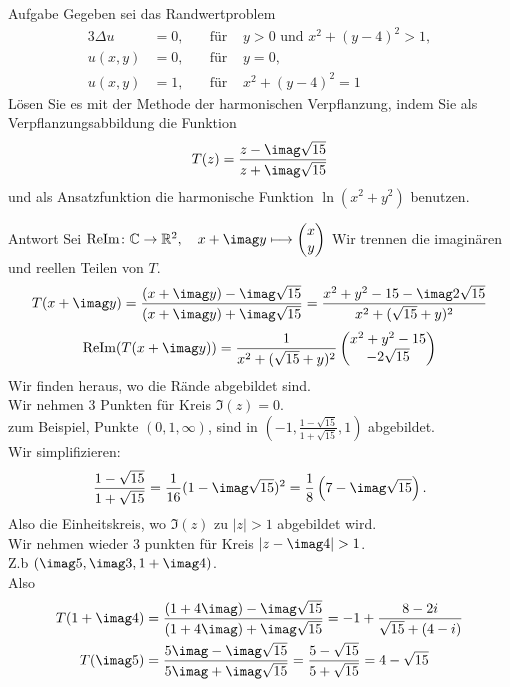 \documentclass{scrartcl}
\def\mbb#1{\mathbb{#1}}
\def\bC{\mbb{C}}
\def\bR{\mbb{R}}
\newcommand{\func}[3]{#1\colon#2\to#3}
\newcommand{\vfunc}[5]{\func{#1}{#2}{#3},\quad#4\longmapsto#5}
\let\-\rightarrow
\begin{document}
\begin{section}{Aufgabe}%
Gegeben sei das Randwertproblem
\begin{alignat*}{3}
 \Delta u&=0,\quad &\text{für }& y>0\text{ und }x^2+(y-4)^2>1,\\
u(x,y)&=0,\quad &\text{für }& y=0,\\
 u(x,y)&=1,\quad &\text{für }& x^2+(y-4)^2=1
\end{alignat*}
Lösen Sie es mit der Methode der harmonischen Verpflanzung, indem Sie als Verpflanzungsabbildung die Funktion
\[T(z)=\frac{z-\imag \sqrt{15}}{z+\imag \sqrt{15}}\]
und als Ansatzfunktion die harmonische Funktion $\ln(x^2+ y^2)$ benutzen.
\begin{subsection}{Antwort}
    Sei $\vfunc{\text{ReIm}}{\bC}{\bR^2}{x+\imag y}{\begin{pmatrix}x\\y\end{pmatrix}}$
    Wir trennen die imaginären und reellen Teilen von $T$.
    \[
    T(x+\imag y)
    =\frac{(x+\imag y)-\imag \sqrt{15}}{(x+\imag y)+\imag \sqrt{15}}
    =\frac{x^2+y^2-15-\imag 2\sqrt{15}}{x^2+(\sqrt{15}+y)^2}
    \]
    \[\text{ReIm}(T(x+\imag y))=\frac{1}{x^2+(\sqrt{15}+y)^2}
    \begin{pmatrix}
        x^2+y^2-15\\-2\sqrt{15}
    \end{pmatrix}
    \]
    Wir finden heraus, wo die Rände abgebildet sind.\\
    Wir nehmen 3 Punkten für Kreis $\Im(z)=0$.\\
    zum Beispiel, Punkte $\left(0,1,\infty\right)$, sind in $\left(-1,\frac{1-\sqrt{15}}{1+\sqrt{15}},1\right)$ abgebildet.\\
    Wir simplifizieren:
    \[\frac{1-\sqrt{15}}{1+\sqrt{15}}=\frac{1}{16}(1-\imag\sqrt{15})^2=\frac{1}{8}\left(7-\imag\sqrt{15}\right).\] Also die Einheitskreis, wo $\Im(z)$ zu $|z|>1$ abgebildet wird.\\
    Wir nehmen wieder 3 punkten für Kreis $|z-\imag 4|>1$.\\
    Z.b $\left(\imag 5,\imag 3,1+\imag 4\right)$.\\
    Also
    \begin{align*}
        T(1+\imag 4)&=\frac{(1+4 \imag)-\imag \sqrt{15}}{(1+4 \imag)+\imag \sqrt{15}}=-1+\frac{8-2 i}{\sqrt{15}+(4-i)}\\
        T(\imag 5)&=\frac{5 \imag-\imag \sqrt{15}}{5 \imag+\imag \sqrt{15}}=\frac{5-\sqrt{15}}{5 +\sqrt{15}}=4-\sqrt{15}\\

\end{align*}
\end{subsection}
\end{section}
\end{document}
